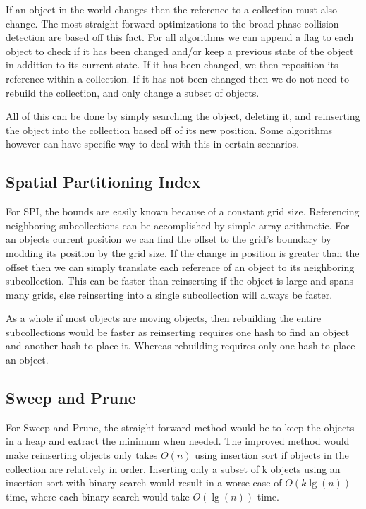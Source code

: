 \documentclass[conference]{IEEEtran}
\begin{document}
If an object in the world changes then the reference to a collection must also change. The most straight forward optimizations to the broad phase collision detection are based off this fact. For all algorithms we can append a flag to each object to check if it has been changed and/or keep a previous state of the object in addition to its current state. If it has been changed, we then reposition its reference within a collection. If it has not been changed then we do not need to rebuild the collection, and only change a subset of objects.

All of this can be done by simply searching the object, deleting it, and reinserting the object into the collection based off of its new position. Some algorithms however can have specific way to deal with this in certain scenarios.

\subsection{Spatial Partitioning Index}

For SPI, the bounds are easily known because of a constant grid size. Referencing neighboring subcollections can be accomplished by simple array arithmetic. For an objects current position we can find the offset to the grid's boundary by modding its position by the grid size. If the change in position is greater than the offset then we can simply translate each reference of an object to its neighboring subcollection. This can be faster than reinserting if the object is large and spans many grids, else reinserting into a single subcollection will always be faster.

As a whole if most objects are moving objects, then rebuilding the entire subcollections would be faster as reinserting requires one hash to find an object and another hash to place it. Whereas rebuilding requires only one hash to place an object.

\subsection{Sweep and Prune}

For Sweep and Prune, the straight forward method would be to keep the objects in a heap and extract the minimum when needed. The improved method would make reinserting objects only takes $O(n)$ using insertion sort if objects in the collection are relatively in order. Inserting only a subset of k objects using an insertion sort with binary search would result in a worse case of $O(k\lg(n))$ time, where each binary search would take $O(\lg(n))$ time.
\end{document}
